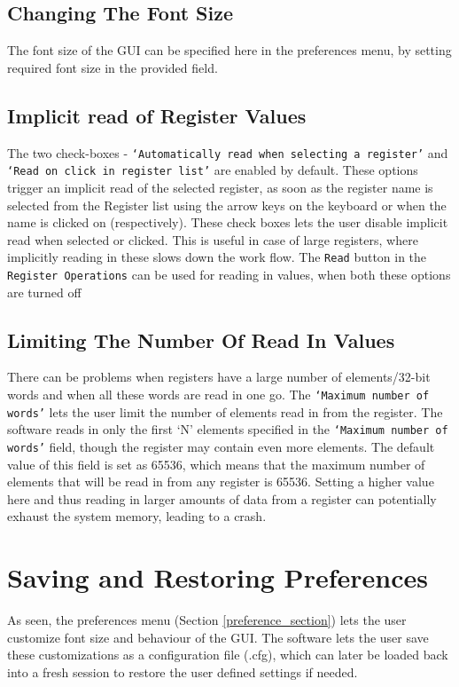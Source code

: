 \subsection{Changing The Font Size}
The font size of the GUI can be specified here in the preferences menu, by setting required font size in the provided field.

\subsection{Implicit read of Register Values}\label{sub::imp_read}
The two check-boxes - \texttt{`Automatically read when selecting a register'} and \texttt{`Read on click in register list'} are enabled by default. These options trigger an implicit read of the selected register, as soon as the register name is selected from the Register list using the arrow keys on the keyboard or when the name is clicked on (respectively). These check boxes lets the user disable implicit read when selected or clicked. This is useful in case of large registers, where implicitly reading in these slows down the work flow. The \texttt{Read} button in the \texttt{Register Operations} can be used for reading in values, when both these options are turned off

\subsection{Limiting The Number Of Read In Values}\label{subsub::graph_x_axis}
There can be problems when registers have a large number of elements/32-bit words and when all these words are read in one go. The \texttt{`Maximum number of words'} lets the user limit the number of elements read in from the register. The software reads in only the first `N' elements specified in the \texttt{`Maximum number of words'} field, though the register may contain even more elements. The default value of this field is set as 65536, which means that the maximum number of elements that will be read in from any register is 65536. Setting a higher value here and thus reading in larger amounts of data from a register can potentially exhaust the system memory, leading to a crash.
		
\section{Saving and Restoring Preferences}
As seen, the preferences menu (Section \ref{preference_section}) lets the user customize font size and behaviour of the GUI. The software lets the user save these customizations as a configuration file (.cfg), which can later be loaded back into a fresh session to restore the user defined settings if needed.

